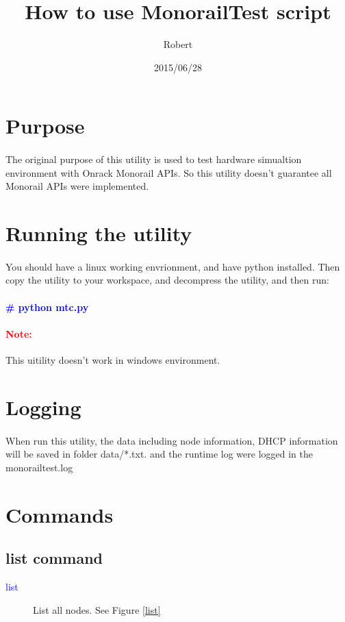 \documentclass [12pt, a4paper, titlepage]{article}
\author{Robert}
\title{\textbf{How to use MonorailTest script}}
\date{2015/06/28}
\begin{document}
\maketitle

\tableofcontents
\clearpage

\section{Purpose}
\paragraph[indent]{}The original purpose of this utility is used to test hardware simualtion environment with Onrack Monorail APIs. So this utility  doesn't guarantee all Monorail APIs were implemented.

\section{Running the utility}
\paragraph[indent]{}You should have a linux working envrionment, and have python installed. Then copy the utility to your workspace, and decompress the utility,  and then run: \\\\
    \textbf{\textcolor{blue}{\# python mtc.py}}
    \paragraph{\textcolor{red}{Note:}} This uitility doesn't work in windows environment.

\section{Logging}
\paragraph[indent]{} When run this utility, the data including node information, DHCP information will be saved in folder data/*.txt. and the runtime log were logged in the monorailtest.log
\section{Commands}
\subsection{list command}
        \begin{description}
            \item[\textcolor{blue}{list}] List all nodes. See Figure \ref{list}
        \end{description}
\end{document}
